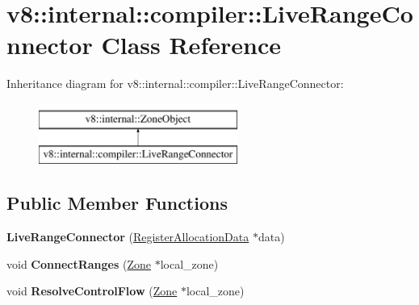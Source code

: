 \hypertarget{classv8_1_1internal_1_1compiler_1_1LiveRangeConnector}{}\section{v8\+:\+:internal\+:\+:compiler\+:\+:Live\+Range\+Connector Class Reference}
\label{classv8_1_1internal_1_1compiler_1_1LiveRangeConnector}
Inheritance diagram for v8\+:\+:internal\+:\+:compiler\+:\+:Live\+Range\+Connector\+:\begin{figure}[H]
\begin{center}
\leavevmode
\includegraphics[height=2.000000cm]{classv8_1_1internal_1_1compiler_1_1LiveRangeConnector}
\end{center}
\end{figure}
\subsection*{Public Member Functions}
\begin{DoxyCompactItemize}
\item 
\mbox{\label{classv8_1_1internal_1_1compiler_1_1LiveRangeConnector_af87fa672971c6bfb118f9c3b5e0db0e5}} 
{\bfseries Live\+Range\+Connector} (\mbox{\hyperlink{classv8_1_1internal_1_1compiler_1_1RegisterAllocationData}{Register\+Allocation\+Data}} $\ast$data)
\item 
\mbox{\label{classv8_1_1internal_1_1compiler_1_1LiveRangeConnector_ae335542bcf27f1fcbb39e1a8701242e3}} 
void {\bfseries Connect\+Ranges} (\mbox{\hyperlink{classv8_1_1internal_1_1Zone}{Zone}} $\ast$local\+\_\+zone)
\item 
\mbox{\label{classv8_1_1internal_1_1compiler_1_1LiveRangeConnector_a86f4fccf715c6230a3e0ceb373f60776}} 
void {\bfseries Resolve\+Control\+Flow} (\mbox{\hyperlink{classv8_1_1internal_1_1Zone}{Zone}} $\ast$local\+\_\+zone)
\end{DoxyCompactItemize}


